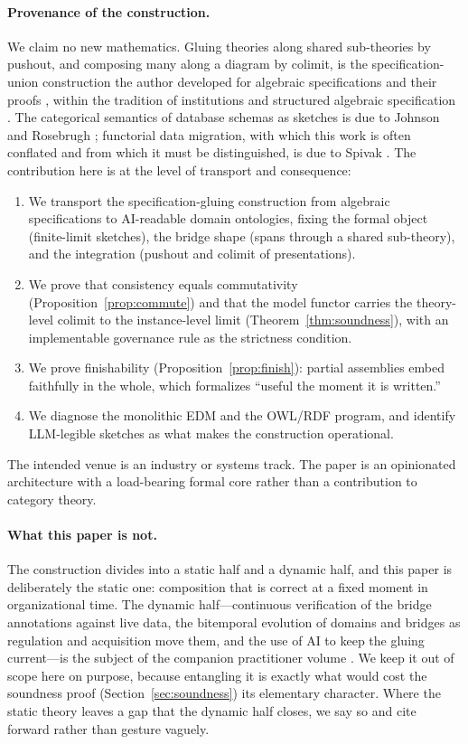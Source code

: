 \documentclass[11pt]{article}
\theoremstyle{plain}
\theoremstyle{definition}
\begin{document}
\paragraph{Provenance of the construction.} We claim no new mathematics. Gluing theories along shared sub-theories by pushout, and composing many along a diagram by colimit, is the specification-union construction the author developed for algebraic specifications and their proofs \cite{cpw2000,pwc2005}, within the tradition of institutions \cite{goguen-burstall} and structured algebraic specification \cite{sannella-tarlecki}. The categorical semantics of database schemas as sketches is due to Johnson and Rosebrugh \cite{johnson-rosebrugh}; functorial data migration, with which this work is often conflated and from which it must be distinguished, is due to Spivak \cite{spivak2012,spivak2014}. The contribution here is at the level of transport and consequence:
\begin{enumerate}[leftmargin=1.4em,itemsep=0.2em]
  \item We transport the specification-gluing construction from algebraic specifications to AI-readable domain ontologies, fixing the formal object (finite-limit sketches), the bridge shape (spans through a shared sub-theory), and the integration (pushout and colimit of presentations).
  \item We prove that consistency equals commutativity (Proposition~\ref{prop:commute}) and that the model functor carries the theory-level colimit to the instance-level limit (Theorem~\ref{thm:soundness}), with an implementable governance rule as the strictness condition.
  \item We prove finishability (Proposition~\ref{prop:finish}): partial assemblies embed faithfully in the whole, which formalizes ``useful the moment it is written.''
  \item We diagnose the monolithic EDM and the OWL/RDF program, and identify LLM-legible sketches as what makes the construction operational.
\end{enumerate}
The intended venue is an industry or systems track. The paper is an opinionated architecture with a load-bearing formal core rather than a contribution to category theory.

\paragraph{What this paper is not.} The construction divides into a static half and a dynamic half, and this paper is deliberately the static one: composition that is correct at a fixed moment in organizational time. The dynamic half---continuous verification of the bridge annotations against live data, the bitemporal evolution of domains and bridges as regulation and acquisition move them, and the use of AI to keep the gluing current---is the subject of the companion practitioner volume \cite{semantic-enterprise}. We keep it out of scope here on purpose, because entangling it is exactly what would cost the soundness proof (Section~\ref{sec:soundness}) its elementary character. Where the static theory leaves a gap that the dynamic half closes, we say so and cite forward rather than gesture vaguely.
\end{document}
